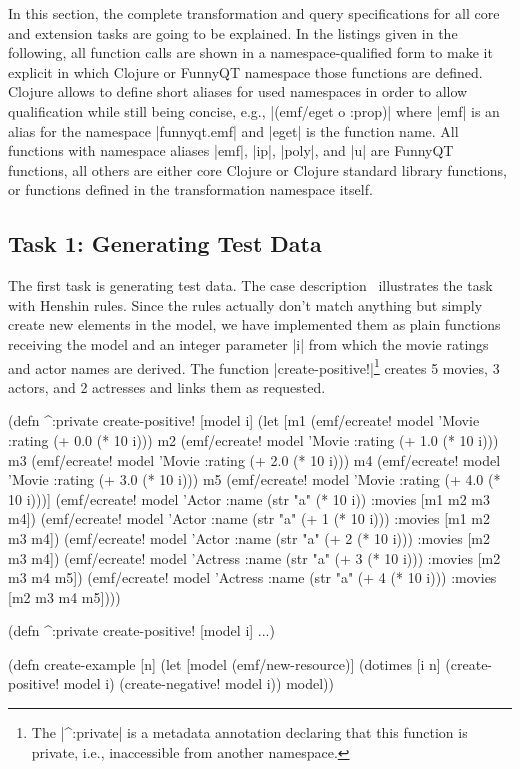 \documentclass[submission]{eptcs}
\newcommand{\code}{\clojureinline}
\begin{document}
In this section, the complete transformation and query specifications for all
core and extension tasks are going to be explained.  In the listings given in
the following, all function calls are shown in a namespace-qualified form to
make it explicit in which Clojure or FunnyQT namespace those functions are
defined.  Clojure allows to define short aliases for used namespaces in order
to allow qualification while still being concise, e.g., \code|(emf/eget o
:prop)| where \code|emf| is an alias for the namespace \code|funnyqt.emf| and
\code|eget| is the function name.  All functions with namespace aliases
\code|emf|, \code|ip|, \code|poly|, and \code|u| are FunnyQT functions, all
others are either core Clojure or Clojure standard library functions, or
functions defined in the transformation namespace itself.


\subsection{Task 1: Generating Test Data}
\label{sec:task-1:generating-test-data}

The first task is generating test data.  The case
description~\cite{movies-case-desc} illustrates the task with Henshin rules.
Since the rules actually don't match anything but simply create new elements in
the model, we have implemented them as plain functions receiving the model and
an integer parameter \code|i| from which the movie ratings and actor names are
derived.  The function \code|create-positive!|\footnote{The \code|^:private| is
  a metadata annotation declaring that this function is private, i.e.,
  inaccessible from another namespace.} creates 5 movies, 3 actors, and 2
actresses and links them as requested.

\begin{clojurecode}
(defn ^:private create-positive! [model i]
  (let [m1 (emf/ecreate! model 'Movie {:rating (+ 0.0 (* 10 i))})
        m2 (emf/ecreate! model 'Movie {:rating (+ 1.0 (* 10 i))})
        m3 (emf/ecreate! model 'Movie {:rating (+ 2.0 (* 10 i))})
        m4 (emf/ecreate! model 'Movie {:rating (+ 3.0 (* 10 i))})
        m5 (emf/ecreate! model 'Movie {:rating (+ 4.0 (* 10 i))})]
    (emf/ecreate! model 'Actor   {:name (str "a" (* 10 i))       :movies [m1 m2 m3 m4]})
    (emf/ecreate! model 'Actor   {:name (str "a" (+ 1 (* 10 i))) :movies [m1 m2 m3 m4]})
    (emf/ecreate! model 'Actor   {:name (str "a" (+ 2 (* 10 i))) :movies [m2 m3 m4]})
    (emf/ecreate! model 'Actress {:name (str "a" (+ 3 (* 10 i))) :movies [m2 m3 m4 m5]})
    (emf/ecreate! model 'Actress {:name (str "a" (+ 4 (* 10 i))) :movies [m2 m3 m4 m5]})))

(defn ^:private create-positive! [model i] ...)

(defn create-example [n]
  (let [model (emf/new-resource)]
    (dotimes [i n]
      (create-positive! model i)
      (create-negative! model i))
    model))
\end{clojurecode}
\end{document}
